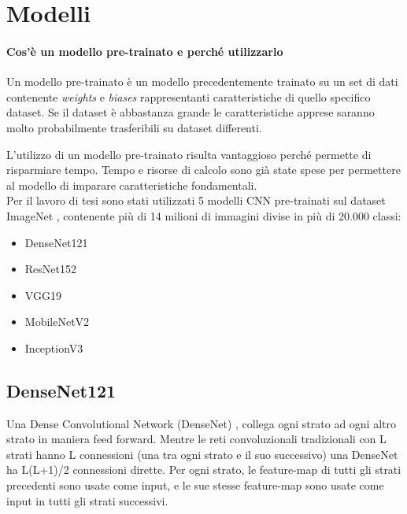 \newpage        

\section{Modelli}

    \paragraph{Cos'è un modello pre-trainato e perché utilizzarlo}
    Un modello pre-trainato è un modello precedentemente trainato su un set di dati contenente \textit{weights} e \textit{biases} rappresentanti caratteristiche di quello specifico dataset. Se il dataset è abbastanza grande le caratteristiche apprese saranno molto probabilmente trasferibili su dataset differenti.
    
    L'utilizzo di un modello pre-trainato risulta vantaggioso perché permette di risparmiare tempo. Tempo e risorse di calcolo sono già state spese per permettere al modello di imparare caratteristiche fondamentali.\\
    
    Per il lavoro di tesi sono stati utilizzati 5 modelli CNN pre-trainati sul dataset ImageNet \cite{deng2009imagenet}, contenente più di 14 milioni di immagini divise in più di 20.000 classi:
        \begin{itemize}
            \item DenseNet121
            \item ResNet152 
            \item VGG19
            \item MobileNetV2
            \item InceptionV3
        \end{itemize}
    \newpage
    
    \subsection{DenseNet121}
    \label{DenseNet121}
    Una Dense Convolutional Network (DenseNet) %
    \cite{huang2016densely}, collega ogni strato ad ogni altro strato in maniera feed forward. Mentre le reti convoluzionali tradizionali con L strati hanno L connessioni (una tra ogni strato e il suo successivo) una DenseNet ha L(L+1)/2 connessioni dirette. Per ogni strato, le feature-map di tutti gli strati precedenti sono usate come input, e le sue stesse feature-map sono usate come input in tutti gli strati successivi. 
    
